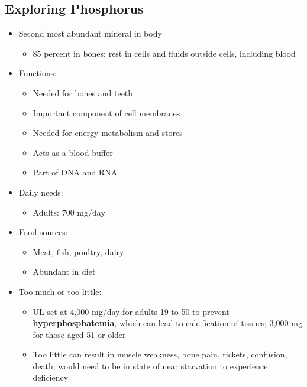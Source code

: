 \documentclass[12pt]{article}
\begin{document}
        \subsection{Exploring Phosphorus}
            \begin{itemize}
                \item Second most abundant mineral in body
                    \begin{itemize}
                        \item 85 percent in bones; rest in cells and fluids outside cells, including blood
                    \end{itemize}
                \item Functions:
                    \begin{itemize}
                        \item Needed for bones and teeth
                        \item Important component of cell membranes
                        \item Needed for energy metabolism and stores
                        \item Acts as a blood buffer
                        \item Part of DNA and RNA
                    \end{itemize}
                \item Daily needs:
                    \begin{itemize}
                        \item Adults: 700 mg/day
                    \end{itemize}
                \item Food sources:
                    \begin{itemize}
                        \item Meat, fish, poultry, dairy
                        \item Abundant in diet
                    \end{itemize}
                \item Too much or too little:
                    \begin{itemize}
                        \item UL set at 4,000 mg/day for adults 19 to 50 to prevent \textbf{hyperphosphatemia}, which can lead to calcification of tissues; 3,000 mg for those aged 51 or older
                        \item Too little can result in muscle weakness, bone pain, rickets, confusion, death; would need to be in state of near starvation to experience deficiency
                    \end{itemize}
            \end{itemize}
    
\end{document}
